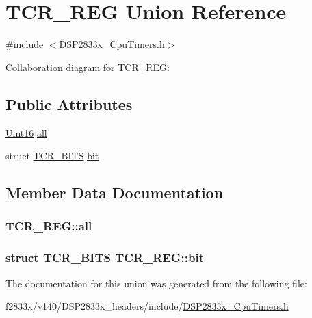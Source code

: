 \hypertarget{union_t_c_r___r_e_g}{}\section{T\+C\+R\+\_\+\+R\+E\+G Union Reference}
\label{union_t_c_r___r_e_g}


{\ttfamily \#include $<$D\+S\+P2833x\+\_\+\+Cpu\+Timers.\+h$>$}



Collaboration diagram for T\+C\+R\+\_\+\+R\+E\+G\+:
\subsection*{Public Attributes}
\begin{DoxyCompactItemize}
\item 
\hyperlink{_d_s_p2833x___device_8h_a59a9f6be4562c327cbfb4f7e8e18f08b}{Uint16} \hyperlink{union_t_c_r___r_e_g_a70acd949c5474bba3e34b5266488d2ff}{all}
\item 
struct \hyperlink{struct_t_c_r___b_i_t_s}{T\+C\+R\+\_\+\+B\+I\+T\+S} \hyperlink{union_t_c_r___r_e_g_a9a6812f7361987c39c12351082b2136c}{bit}
\end{DoxyCompactItemize}


\subsection{Member Data Documentation}
\hypertarget{union_t_c_r___r_e_g_a70acd949c5474bba3e34b5266488d2ff}{}
\subsubsection[{all}]{ T\+C\+R\+\_\+\+R\+E\+G\+::all}\label{union_t_c_r___r_e_g_a70acd949c5474bba3e34b5266488d2ff}
\hypertarget{union_t_c_r___r_e_g_a9a6812f7361987c39c12351082b2136c}{}
\subsubsection[{bit}]{\setlength{\rightskip}{0pt plus 5cm}struct {\bf T\+C\+R\+\_\+\+B\+I\+T\+S} T\+C\+R\+\_\+\+R\+E\+G\+::bit}\label{union_t_c_r___r_e_g_a9a6812f7361987c39c12351082b2136c}


The documentation for this union was generated from the following file\+:\begin{DoxyCompactItemize}
\item 
f2833x/v140/\+D\+S\+P2833x\+\_\+headers/include/\hyperlink{_d_s_p2833x___cpu_timers_8h}{D\+S\+P2833x\+\_\+\+Cpu\+Timers.\+h}\end{DoxyCompactItemize}
